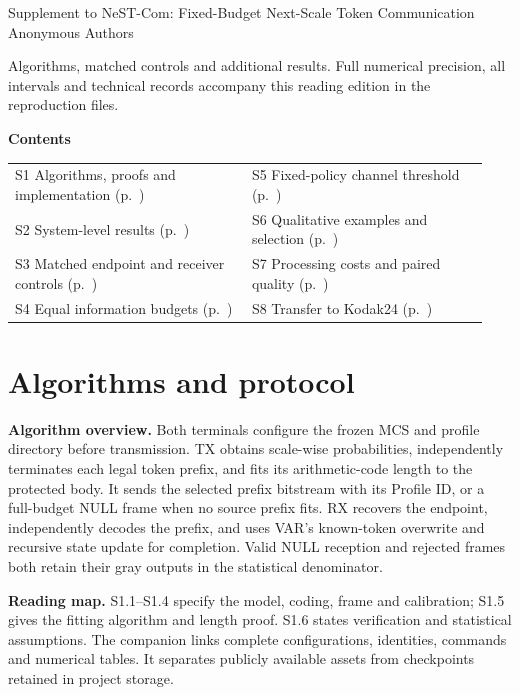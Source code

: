 \documentclass[10pt,letterpaper]{article}
\begin{document}
\begin{center}\Large Supplement to NeST-Com: Fixed-Budget Next-Scale Token Communication\\[4pt]\normalsize Anonymous Authors\end{center}
Algorithms, matched controls and additional results. Full numerical precision, all intervals and technical records accompany this reading edition in the reproduction files.

\textbf{Contents}\par
\begin{tabular}{@{}p{0.47\linewidth}p{0.47\linewidth}@{}}
S1 Algorithms, proofs and implementation (p.~\pageref{sup:1}) & S5 Fixed-policy channel threshold (p.~\pageref{sup:5})\\
S2 System-level results (p.~\pageref{sup:2}) & S6 Qualitative examples and selection (p.~\pageref{sup:6})\\
S3 Matched endpoint and receiver controls (p.~\pageref{sup:3}) & S7 Processing costs and paired quality (p.~\pageref{sup:7})\\
S4 Equal information budgets (p.~\pageref{sup:4}) & S8 Transfer to Kodak24 (p.~\pageref{sup:8})
\end{tabular}


\section{Algorithms and protocol}\label{sup:1}
\textbf{Algorithm overview.} Both terminals configure the frozen MCS and profile directory before transmission. TX obtains scale-wise probabilities, independently terminates each legal token prefix, and fits its arithmetic-code length to the protected body. It sends the selected prefix bitstream with its Profile ID, or a full-budget NULL frame when no source prefix fits. RX recovers the endpoint, independently decodes the prefix, and uses VAR's known-token overwrite and recursive state update for completion. Valid NULL reception and rejected frames both retain their gray outputs in the statistical denominator.

\textbf{Reading map.} S1.1--S1.4 specify the model, coding, frame and calibration; S1.5 gives the fitting algorithm and length proof. S1.6 states verification and statistical assumptions. The companion  links complete configurations, identities, commands and numerical tables. It separates publicly available assets from checkpoints retained in project storage.
\end{document}
